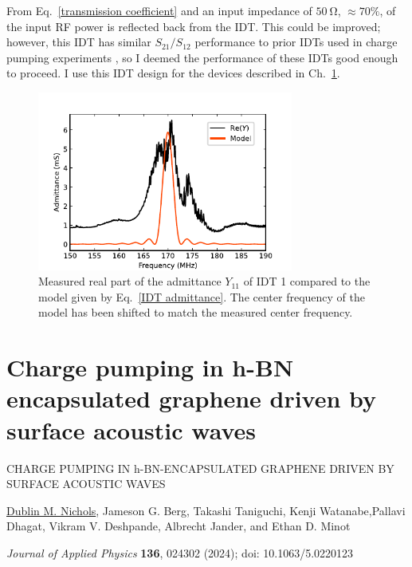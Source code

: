\documentclass[double,12pt,1in,seploa]{beavtex}
\begin{document}
From Eq.\ \ref{transmission coefficient} and an input impedance of $\SI{50}{\ohm}$, $\approx 70\%$, of the input RF power is reflected back from the IDT. This could be improved; however, this IDT has similar $S_{21}/S_{12}$ performance to prior IDTs used in charge pumping experiments \cite{buitelaar_charge_2006}, so I deemed the performance of these IDTs good enough to proceed. I use this IDT design for the devices described in Ch.\ \ref{AE charge pumping paper}.

\begin{figure}
    \includegraphics[width = 0.75\textwidth]{Z11_plot_.pdf}
    \caption{Measured real part of the admittance $Y_{11}$ of IDT 1 compared to the model given by Eq.\ \ref{IDT admittance}. The center frequency of the model has been shifted to match the measured center frequency.}
    \label{Z11 plot}
\end{figure}

\chapter{Charge pumping in h-BN encapsulated graphene driven by surface acoustic waves}\label{AE charge pumping paper}

\clearpage

\mbox{}
\vspace{3cm}
\begin{center}
    {\large CHARGE PUMPING IN h-BN-ENCAPSULATED GRAPHENE DRIVEN BY SURFACE ACOUSTIC WAVES}
    \vspace{4cm}

    \underline{Dublin M. Nichols}, Jameson G. Berg, Takashi Taniguchi, Kenji Watanabe,Pallavi Dhagat, Vikram V. Deshpande, Albrecht Jander, and Ethan D. Minot
    \vspace{3cm}

    \textit{Journal of Applied Physics} \textbf{136}, 024302 (2024); doi: 10.1063/5.0220123
\end{center}
\end{document}
